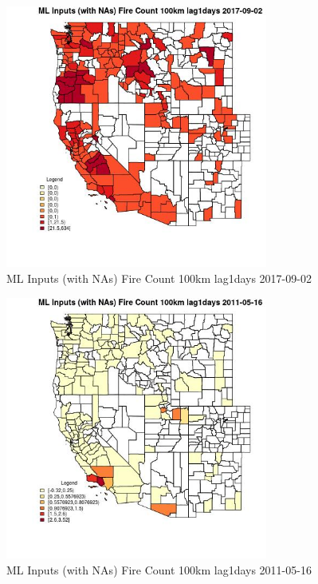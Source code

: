 \begin{figure} 
\centering  
\includegraphics[width=0.77\textwidth]{Code_Outputs/Report_ML_input_PM25_Step4_part_e_de_duplicated_aves_compiled_2019-05-21wNAs_CountyFire_Count_100km_lag1daysMean2017-09-02.jpg} 
\caption{\label{fig:Report_ML_input_PM25_Step4_part_e_de_duplicated_aves_compiled_2019-05-21wNAsCountyFire_Count_100km_lag1daysMean2017-09-02}ML Inputs (with NAs) Fire Count 100km lag1days 2017-09-02} 
\end{figure} 
 

\begin{figure} 
\centering  
\includegraphics[width=0.77\textwidth]{Code_Outputs/Report_ML_input_PM25_Step4_part_e_de_duplicated_aves_compiled_2019-05-21wNAs_CountyFire_Count_100km_lag1daysMean2011-05-16.jpg} 
\caption{\label{fig:Report_ML_input_PM25_Step4_part_e_de_duplicated_aves_compiled_2019-05-21wNAsCountyFire_Count_100km_lag1daysMean2011-05-16}ML Inputs (with NAs) Fire Count 100km lag1days 2011-05-16} 
\end{figure} 
 

